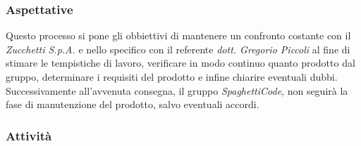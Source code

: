 \documentclass[../norme_di_progetto.tex]{subfiles}
\begin{document}
\subsubsection{Aspettative}
Questo processo si pone gli obbiettivi di mantenere un confronto costante con il  \emph{Zucchetti S.p.A.} e nello specifico con il referente \emph{dott. Gregorio Piccoli} al fine di stimare le tempistiche di lavoro, verificare in modo continuo quanto prodotto dal gruppo, determinare i requisiti del prodotto e infine chiarire eventuali dubbi.
Successivamente all'avvenuta consegna, il gruppo \emph{SpaghettiCode}, non seguirà la fase di manutenzione del prodotto, salvo eventuali accordi.

\subsubsection{Attività}
\end{document}
